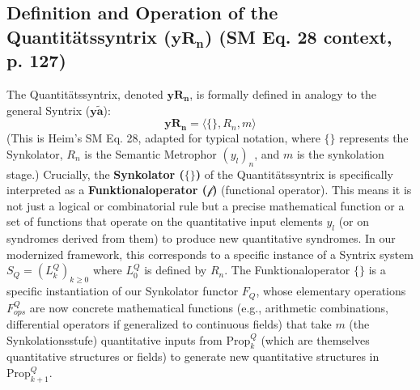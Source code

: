 \documentclass[
    12pt,              %
    a4paper,           %
    headings=normal,   %
    twoside=true,      %
    BCOR=8mm,          %
]{scrbook}
\newcommand{\syntrix}{\bm{y\widetilde{a}}}
\newcommand{\synkolationsstufe}{m}
\newcommand{\quantitaetssyntrix}{\bm{yR_n}}
\newcommand{\semantischermetrophor}{R_n}
\newcommand{\funktionaloperator}{\mathcal{f}}
\begin{document}
\subsection{\texorpdfstring{Definition and Operation of the Quantitätssyntrix (\(\quantitaetssyntrix\)) (SM Eq. 28 context, p. 127)}{Definition and Operation of the Quantitatssyntrix (yRn) (SM Eq. 28 context, p. 127)}}
\label{sec:ch7_2_3_def_op_quant}
The Quantitätssyntrix, denoted \(\quantitaetssyntrix\), is formally defined in analogy to the general Syntrix (\(\syntrix\)):
\[ \quantitaetssyntrix = \langle \{\}, \semantischermetrophor, \synkolationsstufe \rangle \]
(This is Heim's SM Eq. 28, adapted for typical notation, where \(\{\}\) represents the Synkolator, \(\semantischermetrophor\) is the Semantic Metrophor \((y_l)_n\), and \(\synkolationsstufe\) is the synkolation stage.)
Crucially, the \textbf{Synkolator (\(\{\}\))} of the Quantitätssyntrix is specifically interpreted as a \textbf{Funktionaloperator (\(\funktionaloperator\))} (functional operator). This means it is not just a logical or combinatorial rule but a precise mathematical function or a set of functions that operate on the quantitative input elements \(y_l\) (or on syndromes derived from them) to produce new quantitative syndromes.
In our modernized framework, this corresponds to a specific instance of a Syntrix system \(S_Q = (L_k^Q)_{k \ge 0}\) where \(L_0^Q\) is defined by \(\semantischermetrophor\). The Funktionaloperator \(\{\}\) is a specific instantiation of our Synkolator functor \(F_Q\), whose elementary operations \(F_{ops}^Q\) are now concrete mathematical functions (e.g., arithmetic combinations, differential operators if generalized to continuous fields) that take \(\synkolationsstufe\) (the Synkolationsstufe) quantitative inputs from \(\text{Prop}_k^Q\) (which are themselves quantitative structures or fields) to generate new quantitative structures in \(\text{Prop}_{k+1}^Q\).
\end{document}
